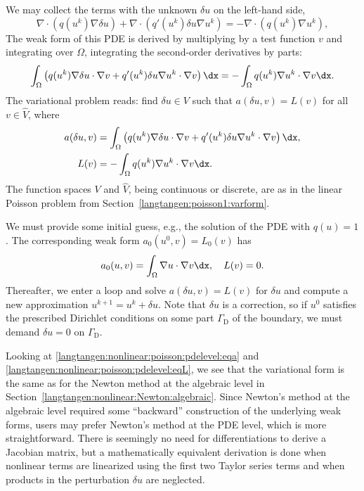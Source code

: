 \clearpage

\noindent
We may collect the terms with the unknown $\delta u$ on the left-hand side,
\begin{equation}
\nabla\cdot\left( q(u^k)\nabla\delta u\right) +
\nabla\cdot\left( q'(u^k)\delta u\nabla u^k\right) =
-\nabla\cdot\left( q(u^k)\nabla u^k\right),
\end{equation}
The weak form of this PDE is derived by multiplying by a test function $v$
and integrating over $\Omega$, integrating the second-order derivatives
by parts:
\begin{equation}
\int_\Omega \left(
q(u^k)\nabla\delta u\cdot \nabla v
+ q'(u^k)\delta u\nabla u^k\cdot \nabla v\right)\dx
= -\int_\Omega q(u^k)\nabla u^k\cdot \nabla v\dx.
\end{equation}
The variational problem reads: find $\delta u\in V$ such that
$a(\delta u,v) = L(v)$ for all $v\in \hat V$, where
\begin{align}
a(\delta u,v) &= \int_\Omega \left( q(u^k)\nabla\delta u\cdot \nabla v
+ q'(u^k)\delta u\nabla u^k\cdot \nabla v\right)\dx,
\label{langtangen:nonlinear:poisson:pdelevel:eqa}
\\
L(v) &= - \int_\Omega q(u^k)\nabla u^k\cdot \nabla v\dx.
\label{langtangen:nonlinear:poisson:pdelevel:eqL}
\end{align}
The function spaces $V$ and $\hat V$, being continuous
or discrete, are as in the linear Poisson problem from
Section~\ref{langtangen:poisson1:varform}.

We must provide some initial guess, e.g., the solution of the
PDE with $q(u)=1$. The corresponding weak form $a_0(u^0,v)=L_0(v)$
has
\begin{equation}
a_0(u,v)=\int_\Omega\nabla u\cdot \nabla v\dx,\quad
L(v)=0.
\end{equation}
Thereafter, we enter a loop and solve $a(\delta u,v)=L(v)$ for $\delta
u$ and compute a new approximation $u^{k+1} = u^k + \delta u$. Note
that $\delta u$ is a correction, so if $u^0$ satisfies the prescribed
Dirichlet conditions on some part $\Gamma_{\mathrm{D}}$ of the boundary, we must
demand $\delta u=0$ on $\Gamma_{\mathrm{D}}$.

Looking at \eqref{langtangen:nonlinear:poisson:pdelevel:eqa} and
\eqref{langtangen:nonlinear:poisson:pdelevel:eqL}, we see that the
variational form is the same as for the Newton method at the algebraic
level in Section~\ref{langtangen:nonlinear:Newton:algebraic}. Since
Newton's method at the algebraic level required some ``backward''
construction of the underlying weak forms, \fenics{} users may prefer
Newton's method at the PDE level, which is more straightforward.  There is
seemingly no need for differentiations to derive a Jacobian matrix, but
a mathematically equivalent derivation is done when nonlinear terms are
linearized using the first two Taylor series terms and when products in
the perturbation $\delta u$ are neglected.

